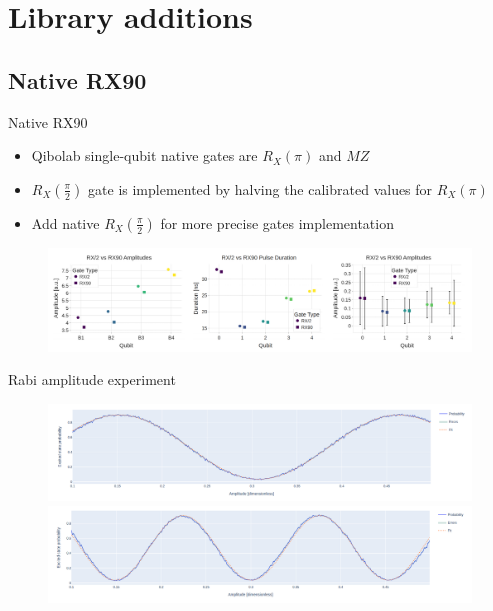\documentclass[aspectratio=169,10pt]{beamer}
\begin{document}
\section{Library additions}
\subsection{Native RX90}

\begin{frame}{Native RX90}
  \begin{itemize}
    \item Qibolab single-qubit native gates are $R_X(\pi)$ and $MZ$
    \item $R_X(\frac{\pi}{2})$ gate is implemented by halving the calibrated values for $R_X(\pi)$ 
    \item Add native $R_X(\frac{\pi}{2})$ for more precise gates implementation
  \end{itemize}
  \begin{figure}
    \centering
    \includegraphics[width=\textwidth]{figures/RX90.png}
  \end{figure}
\end{frame}

\begin{frame}{Rabi amplitude experiment}
    \begin{figure}
    \centering
    \includegraphics[width=\textwidth]{figures/B4.png}
    \vfill
    \includegraphics[width=\textwidth]{figures/B4_90.png}
  \end{figure}
\end{frame}
\end{document}
